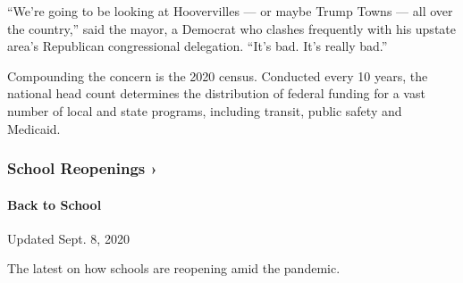 ``We're going to be looking at Hoovervilles --- or maybe Trump Towns ---
all over the country,'' said the mayor, a Democrat who clashes
frequently with his upstate area's Republican congressional delegation.
``It's bad. It's really bad.''

Compounding the concern is the 2020 census. Conducted every 10 years,
the national head count determines the distribution of federal funding
for a vast number of local and state programs, including transit, public
safety and Medicaid.

\href{https://www.nytimes3xbfgragh.onion/spotlight/schools-reopening?action=click\&pgtype=Article\&state=default\&region=MAIN_CONTENT_3\&context=storylines_keepup}{}

\hypertarget{school-reopenings-}{%
\subsubsection{School Reopenings ›}\label{school-reopenings-}}

\hypertarget{back-to-school}{%
\paragraph{Back to School}\label{back-to-school}}

Updated Sept. 8, 2020

The latest on how schools are reopening amid the pandemic.

